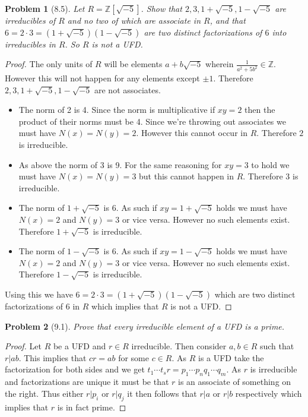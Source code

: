 \documentclass[10pt]{article}
\newcommand{\sk}{\vskip 10mm}
\newcommand{\bb}[1]{\mathbb{#1}}
\theoremstyle{plain}
\newtheorem{problem}{Problem}
\theoremstyle{remark}
\begin{document}
 \begin{problem}[8.5]
  Let $R=\bb{Z}[\sqrt{-5}]$. Show that $2,3,1+\sqrt{-5},1-\sqrt{-5}$ are
  irreducibles of $R$ and no two of which are associate in $R$, and that
  $6=2\cdot 3=(1+\sqrt{-5})(1-\sqrt{-5})$ are two distinct factorizations of
  $6$ into irreducibles in $R$. So $R$ is not a UFD.
\end{problem}

\begin{proof}
  The only units of $R$ will be elements $a+b\sqrt{-5}$ wherein
  $\frac{1}{a^2+5b^2}\in\bb{Z}$. However this will not happen for any elements
  except $\pm 1$. Therefore $2,3,1+\sqrt{-5},1-\sqrt{-5}$ are not associates.
  \begin{itemize}
  \item The norm of 2 is 4. Since the norm is multiplicative if $xy=2$ then
    the product of their norms must be 4. Since we're throwing out associates
    we must have $N(x)=N(y)=2$. However this cannot occur in $R$. Therefore
    $2$ is irreducible.
  \item As above the norm of 3 is 9. For the same reasoning for $xy=3$ to hold
    we must have $N(x)=N(y)=3$ but this cannot happen in $R$. Therefore $3$ is
    irreducible.
  \item The norm of $1+\sqrt{-5}$ is $6$. As such if $xy=1+\sqrt{-5}$ holds
    we must have $N(x)=2$ and $N(y)=3$ or vice versa. However no such elements
    exist. Therefore $1+\sqrt{-5}$ is irreducible.
  \item The norm of $1-\sqrt{-5}$ is $6$. As such if $xy=1-\sqrt{-5}$ holds
    we must have $N(x)=2$ and $N(y)=3$ or vice versa. However no such elements
    exist. Therefore $1-\sqrt{-5}$ is irreducible.
  \end{itemize}

  Using this we have $6=2\cdot 3 = (1+\sqrt{-5})(1-\sqrt{-5})$ which are two distinct
  factorizations of $6$ in $R$ which implies that $R$ is not a UFD.
\end{proof}

\sk

\begin{problem}[9.1]
  Prove that every irreducible element of a UFD is a prime.
\end{problem}

\begin{proof}
  Let $R$ be a UFD and $r\in R$ irreducible. Then consider $a,b\in R$ such that
  $r|ab$. This implies that $cr=ab$ for some $c\in R$. As $R$ is a UFD take the
  factorization for both sides and we get $t_1\cdots t_sr=p_1\cdots p_nq_1\cdots q_m$.
  As $r$ is irreducible and factorizations are unique it must be that
  $r$ is an associate of something on the right. Thus either
  $r|p_i$ or $r|q_j$ it then follows that $r|a$ or $r|b$ respectively
  which implies that $r$ is in fact prime.
\end{proof}
\end{document}
